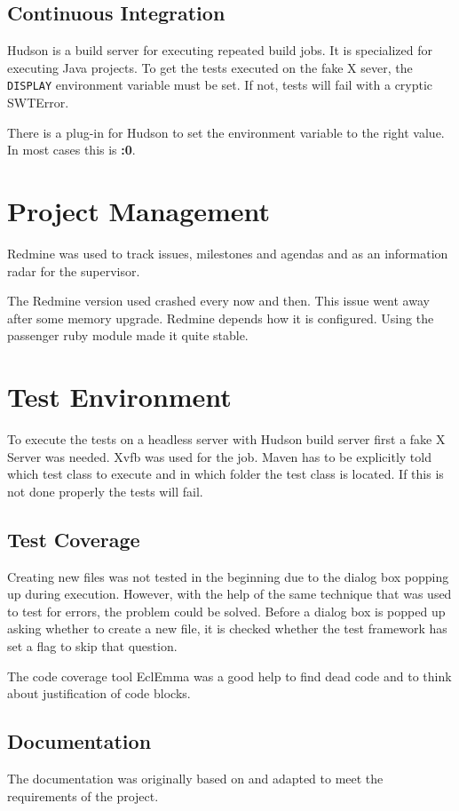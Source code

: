 \subsection{Continuous Integration}

Hudson is a build server for executing repeated build jobs. It is specialized
for executing Java projects. To get the tests executed on the fake X sever, the
\texttt{DISPLAY} environment variable must be set. If not, tests will fail with
a cryptic SWTError.

There is a plug-in for Hudson\cite{hudson} to set the environment variable to
the right value. In most cases this is \textbf{:0}.

\section{Project Management}

Redmine\cite{redmine} was used to track issues, milestones and agendas and as an information 
radar for the supervisor.

The Redmine version used crashed every now and then. This issue went away after
some memory upgrade. Redmine depends how it is configured. Using the passenger
ruby module made it quite stable. 

\section{Test Environment}

To execute the tests on a headless server with Hudson build server first a fake
X Server was needed. Xvfb\cite{xvfb} was used for the job. Maven has to be
explicitly told which test class to execute and in which folder the test class
is located. If this is not done properly the tests will fail.

\subsection{Test Coverage}

Creating new files was not tested in the beginning due to the dialog box popping 
up during execution. However, with the help of the same technique that was used 
to test for errors, the problem could be solved. Before a dialog box is popped 
up asking whether to create a new file, it is checked whether the test framework 
has set a flag to skip that question.

The code coverage tool EclEmma\cite{eclEmma} was a good help to find dead code 
and to think about justification of code blocks.

\subsection{Documentation}

The documentation was originally based on \cite{AV08} and adapted to meet the 
requirements of the project.


